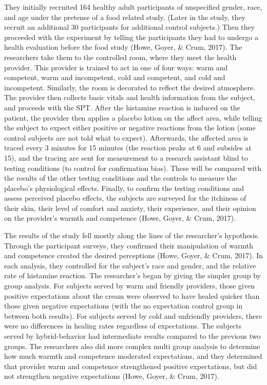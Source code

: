\documentclass[a4paper, 10pt]{article}
\begin{document}
They initially recruited 164 healthy adult participants of unspecified gender, race, and age under the pretense of a food related study. (Later in the study, they recruit an additional 30 participants for additional control subjects.) Then they proceeded with the experiment by telling the participants they had to undergo a health evaluation before the food study (Howe, Goyer, \& Crum, 2017). The researchers take them to the controlled room, where they meet the health provider. This provider is trained to act in one of four ways: warm and
 competent, warm and incompetent, cold and competent, and cold and incompetent. Similarly, the room is decorated to reflect the desired atmosphere. The provider then collects basic vitals and health information from the subject, and proceeds with the SPT. After the histamine reaction is induced on the patient, the provider then applies a placebo lotion on the affect area, while telling the subject to expect either positive or negative reactions from the lotion (some control subjects are not told
 what to expect). Afterwards, the affected area is traced every 3 minutes for 15 minutes (the reaction peaks at 6 and subsides at 15), and the tracing are sent for measurement to a research assistant blind to testing conditions (to control for confirmation bias). These will be compared with the results of the other testing conditions and the controls to measure the placebo's physiological effects. Finally, to confirm the testing conditions and assess perceived placebo effects, the subjects are surveyed for the itchiness
 of their skin, their level of comfort and anxiety, their experience, and their opinion on the provider's warmth and competence (Howe, Goyer, \& Crum, 2017).

The results of the study fell mostly along the lines of the researcher's hypothesis. Through the participant surveys, they confirmed their manipulation of warmth and competence created the desired perceptions (Howe, Goyer, \& Crum, 2017). In each analysis, they controlled for the subject's race and gender, and the relative rate of histamine reaction. The researcher's began by giving the simpler group by group analysis. For subjects served by warm and friendly providers, those given positive expectations about the cream were
 observed to have healed quicker than those given negative expectations (with the no expectation control group in between both results). For subjects served by cold and unfriendly providers, there were no differences in healing rates regardless of expectations. The subjects served by hybrid-behavior had intermediate results compared to the previous two groups. The researchers also did more complex multi group analysis to determine how much warmth and competence moderated expectations, and they determined
 that provider warm and competence strengthened positive expectations, but did not strengthen negative expectations (Howe, Goyer, \& Crum, 2017).
\end{document}
